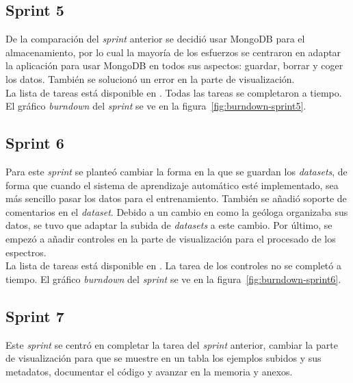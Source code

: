 
\subsection{Sprint 5}
De la comparación del \textit{sprint} anterior se decidió usar MongoDB para el
almacenamiento, por lo cual la mayoría de los esfuerzos se centraron en adaptar
la aplicación para usar MongoDB en todos sus aspectos: guardar, borrar y coger
los datos. También se solucionó un error en la parte de visualización.\\

La lista de tareas está disponible en
. Todas las tareas se completaron a tiempo. El gráfico \textit{burndown} del 
\textit{sprint} se ve en la figura~\ref{fig:burndown-sprint5}.\\


\subsection{Sprint 6}
Para este \textit{sprint} se planteó cambiar la forma en la que se guardan los
\textit{datasets}, de forma que cuando el sistema de aprendizaje automático esté
implementado, sea más sencillo pasar los datos para el entrenamiento. También se
añadió soporte de comentarios en el \textit{dataset}. Debido a un cambio en como
la geóloga organizaba sus datos, se tuvo que adaptar la subida de
\textit{datasets} a este cambio. Por último, se empezó a añadir controles en la
parte de visualización para el procesado de los espectros.\\

La lista de tareas está disponible en
. La tarea de los controles no se completó a tiempo. El gráfico 
\textit{burndown} del \textit{sprint} se ve en la 
figura~\ref{fig:burndown-sprint6}.\\


\subsection{Sprint 7}
Este \textit{sprint} se centró en completar la tarea del \textit{sprint}
anterior, cambiar la parte de visualización para que se muestre en un tabla los
ejemplos subidos y sus metadatos, documentar el código y avanzar en la memoria y
anexos.\\

